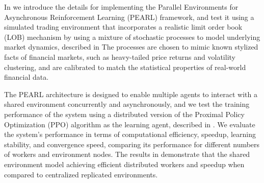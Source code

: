 In  we introduce the details for implementing the Parallel Environments for Asynchronous Reinforcement Learning (PEARL) framework,
and test it using a simulated trading environment that incorporates a realistic limit order book (LOB) mechanism
by using a mixture of stochastic processes to model underlying market dynamics, described in 
The processes are chosen to mimic known stylized facts of financial markets, such as heavy-tailed price returns and
volatility clustering, and are calibrated to match the statistical properties of real-world financial data.

The PEARL architecture is designed to enable multiple agents to interact with a shared environment concurrently and asynchronously,
and we test the training performance of the system using a distributed version of the Proximal Policy Optimization (PPO) algorithm
as the learning agent, described in .
We evaluate the system's performance in terms of computational efficiency, speedup, learning stability, and convergence speed,
comparing its performance for different numbers of workers and environment nodes.
The results in  demonstrate that the shared environment model
achieving efficient distributed workers and speedup when compared to centralized replicated environments.
